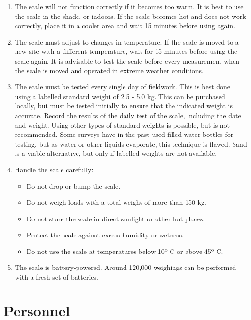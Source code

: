 \documentclass[12pt,]{book}
\providecommand{\tightlist}{%
  \setlength{\itemsep}{0pt}\setlength{\parskip}{0pt}}
\theoremstyle{definition}
\theoremstyle{definition}
\theoremstyle{definition}
\theoremstyle{remark}
\begin{document}
\begin{enumerate}
\def\labelenumi{\arabic{enumi}.}
\setcounter{enumi}{1}
\item
  The scale will not function correctly if it becomes too warm. It is
  best to use the scale in the shade, or indoors. If the scale becomes
  hot and does not work correctly, place it in a cooler area and wait 15
  minutes before using again.
\item
  The scale must adjust to changes in temperature. If the scale is moved
  to a new site with a different temperature, wait for 15 minutes before
  using the scale again. It is advisable to test the scale before every
  measurement when the scale is moved and operated in extreme weather
  conditions.
\item
  The scale must be tested every single day of fieldwork. This is best
  done using a labelled standard weight of 2.5 - 5.0 kg. This can be
  purchased locally, but must be tested initially to ensure that the
  indicated weight is accurate. Record the results of the daily test of
  the scale, including the date and weight. Using other types of
  standard weights is possible, but is not recommended. Some surveys
  have in the past used filled water bottles for testing, but as water
  or other liquids evaporate, this technique is flawed. Sand is a viable
  alternative, but only if labelled weights are not available.
\item
  Handle the scale carefully:

  \begin{itemize}
  \tightlist
  \item
    Do not drop or bump the scale.
  \item
    Do not weigh loads with a total weight of more than 150 kg.
  \item
    Do not store the scale in direct sunlight or other hot places.
  \item
    Protect the scale against excess humidity or wetness.
  \item
    Do not use the scale at temperatures below 10º C or above 45º C.
  \end{itemize}
\item
  The scale is battery-powered. Around 120,000 weighings can be
  performed with a fresh set of batteries.
\end{enumerate}

\hypertarget{personnel}{%
\section{Personnel}\label{personnel}}
\end{document}
